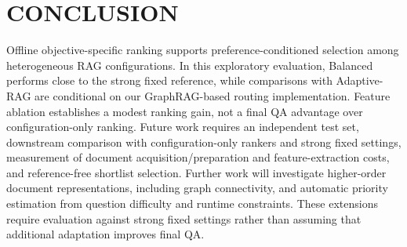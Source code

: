 \vspace{-3pt}
\section{\uppercase{Conclusion}} \label{sec6}
Offline objective-specific ranking supports preference-conditioned selection among heterogeneous RAG configurations. In this exploratory evaluation, Balanced performs close to the strong fixed reference, while comparisons with Adaptive-RAG are conditional on our GraphRAG-based routing implementation. Feature ablation establishes a modest ranking gain, not a final QA advantage over configuration-only ranking. Future work requires an independent test set, downstream comparison with configuration-only rankers and strong fixed settings, measurement of document acquisition/preparation and feature-extraction costs, and reference-free shortlist selection. Further work will investigate higher-order document representations, including graph connectivity, and automatic priority estimation from question difficulty and runtime constraints. These extensions require evaluation against strong fixed settings rather than assuming that additional adaptation improves final QA.
